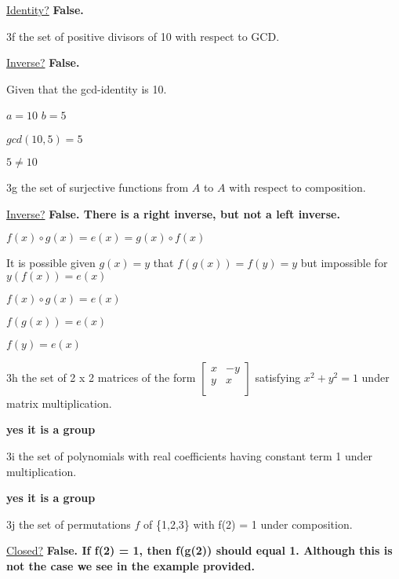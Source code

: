 \underline{Identity?} \textbf{False.}



\begin{question}{3f}
the set of positive divisors of 10 with respect to GCD.
\end{question}

\underline{Inverse?} \textbf{False.}

Given that the gcd-identity is 10.

$a=10$ $b=5$

$gcd(10,5) = 5$ 

$5 \neq 10$

\begin{question}{3g}
the set of surjective functions from $A$ to $A$ with respect to composition.
\end{question}

\underline{Inverse?} \textbf{False. There is a right inverse, but not a left inverse.}

$f(x) \circ g(x) = e(x) = g(x) \circ f(x)$

It is possible given $g(x) = y$ that $f(g(x)) = f(y) = y$ but impossible for $y(f(x)) = e(x)$

$f(x) \circ g(x) = e(x)$

$f(g(x)) = e(x)$

$f(y) = e(x)$

\begin{question}{3h}
the set of 2 x 2 matrices of the form $\begin{bmatrix}
  x & -y \\
  y & x  \\
 \end{bmatrix}$ satisfying $x^2 + y^2 = 1$ under matrix multiplication.

\end{question}

\textbf{yes it is a group}

\begin{question}{3i}
the set of polynomials with real coefficients having constant term 1 under multiplication.
\end{question}

\textbf{yes it is a group}

\begin{question}{3j}
the set of permutations $f$ of \{1,2,3\} with f(2) = 1 under composition.
\end{question}

\underline{Closed?} \textbf{False. If f(2) = 1, then f(g(2)) should equal 1. Although this is not the case we see in the example provided. }

